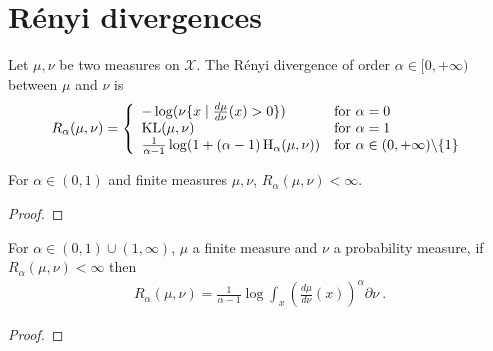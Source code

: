 \chapter{Rényi divergences}

\begin{definition}
  \label{def:Renyi}
  \leanok
  Let $\mu, \nu$ be two measures on $\mathcal X$. The Rényi divergence of order $\alpha \in [0,+\infty)$ between $\mu$ and $\nu$ is
  \begin{align*}
  R_\alpha(\mu, \nu) = \left\{
 \begin{array}{ll}
  - \log(\nu\{x \mid \frac{d \mu}{d \nu}(x) > 0\}) & \text{for } \alpha = 0
  \\
  \operatorname{KL}(\mu, \nu) & \text{for } \alpha = 1
  \\
  \frac{1}{\alpha - 1} \log (1 + (\alpha - 1) \operatorname{H}_\alpha(\mu, \nu)) & \text{for } \alpha \in (0,+\infty) \backslash \{1\}
  \end{array}\right.
  \end{align*}
\end{definition}

\begin{lemma}
  \label{lem:renyiDiv_ne_top_of_lt_one}
  \leanok
  For $\alpha \in (0, 1)$ and finite measures $\mu, \nu$, $R_\alpha(\mu, \nu) < \infty$.
\end{lemma}

\begin{proof}\leanok
{}
\end{proof}

\begin{lemma}
  \label{lem:renyi_eq_log_integral}
  \leanok
  For $\alpha \in (0,1)\cup(1, \infty)$, $\mu$ a finite measure and $\nu$ a probability measure, if $R_\alpha(\mu, \nu) < \infty$ then
  \begin{align*}
  R_\alpha(\mu, \nu) = \frac{1}{\alpha - 1} \log \int_x \left(\frac{d \mu}{d \nu}(x)\right)^\alpha \partial \nu
  \: .
  \end{align*}
\end{lemma}

\begin{proof}\leanok
{}
\end{proof}

